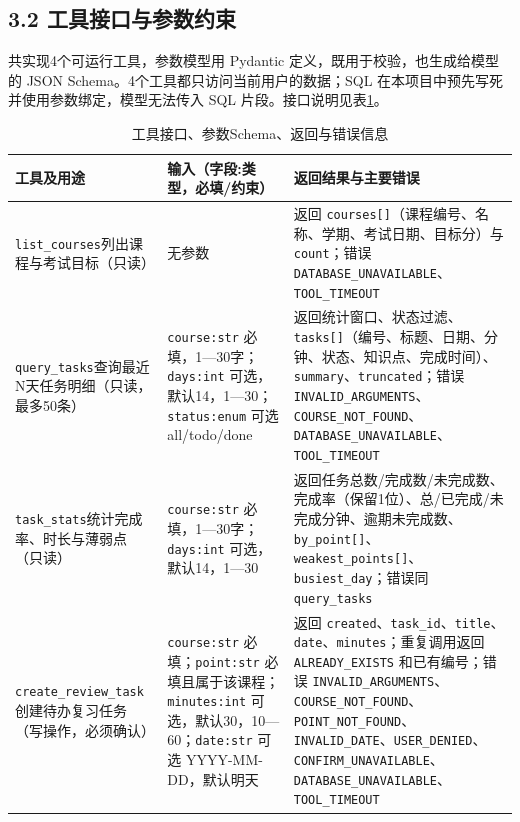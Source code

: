 \documentclass[UTF8,12pt,a4paper]{ctexart}
\begin{document}
\subsection*{3.2 工具接口与参数约束}

共实现4个可运行工具，参数模型用 Pydantic 定义，既用于校验，也生成给模型的 JSON Schema。4个工具都只访问当前用户的数据；SQL 在本项目中预先写死并使用参数绑定，模型无法传入 SQL 片段。接口说明见表\ref{tab:tools}。

\begin{table}[H]
\centering
\caption{工具接口、参数Schema、返回与错误信息}
\label{tab:tools}
\scriptsize
\begin{tabularx}{\textwidth}{p{2.9cm}p{4.5cm}X}
\toprule
工具及用途 & 输入（字段:类型，必填/约束） & 返回结果与主要错误 \\
\midrule
\texttt{list\_courses}\newline 列出课程与考试目标（只读） & 无参数 & 返回 \texttt{courses[]}（课程编号、名称、学期、考试日期、目标分）与 \texttt{count}；错误 \texttt{DATABASE\_UNAVAILABLE}、\texttt{TOOL\_TIMEOUT} \\
\texttt{query\_tasks}\newline 查询最近N天任务明细（只读，最多50条） & \texttt{course:str} 必填，1—30字；\texttt{days:int} 可选，默认14，1—30；\texttt{status:enum} 可选 all/todo/done & 返回统计窗口、状态过滤、\texttt{tasks[]}（编号、标题、日期、分钟、状态、知识点、完成时间）、\texttt{summary}、\texttt{truncated}；错误 \texttt{INVALID\_ARGUMENTS}、\texttt{COURSE\_NOT\_FOUND}、\texttt{DATABASE\_UNAVAILABLE}、\texttt{TOOL\_TIMEOUT} \\
\texttt{task\_stats}\newline 统计完成率、时长与薄弱点（只读） & \texttt{course:str} 必填，1—30字；\texttt{days:int} 可选，默认14，1—30 & 返回任务总数/完成数/未完成数、完成率（保留1位）、总/已完成/未完成分钟、逾期未完成数、\texttt{by\_point[]}、\texttt{weakest\_points[]}、\texttt{busiest\_day}；错误同 \texttt{query\_tasks} \\
\texttt{create\_review\_task}\newline 创建待办复习任务（写操作，必须确认） & \texttt{course:str} 必填；\texttt{point:str} 必填且属于该课程；\texttt{minutes:int} 可选，默认30，10—60；\texttt{date:str} 可选 YYYY-MM-DD，默认明天 & 返回 \texttt{created}、\texttt{task\_id}、\texttt{title}、\texttt{date}、\texttt{minutes}；重复调用返回 \texttt{ALREADY\_EXISTS} 和已有编号；错误 \texttt{INVALID\_ARGUMENTS}、\texttt{COURSE\_NOT\_FOUND}、\texttt{POINT\_NOT\_FOUND}、\texttt{INVALID\_DATE}、\texttt{USER\_DENIED}、\texttt{CONFIRM\_UNAVAILABLE}、\texttt{DATABASE\_UNAVAILABLE}、\texttt{TOOL\_TIMEOUT} \\
\bottomrule
\end{tabularx}
\end{table}
\end{document}
